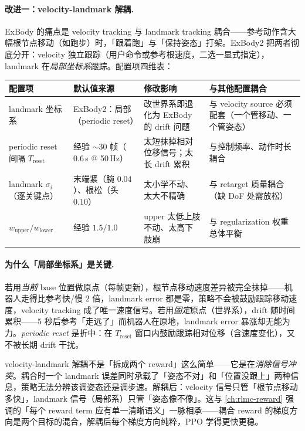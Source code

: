\paragraph{改进一：velocity-landmark 解耦.}
ExBody 的痛点是 velocity tracking 与 landmark tracking 耦合——参考动作含大幅根节点移动（如跑步）时，「跟着跑」与「保持姿态」打架。ExBody2 把两者彻底分开：velocity 独立跟踪（用户命令或参考根速度，二选一显式指定），landmark 在\emph{局部坐标系}跟踪。配置项四维表：

\begin{center}
\small
\begin{tabular}{p{2.6cm}p{2.8cm}p{3.0cm}p{3.0cm}}
\hline
配置项 & 默认值来源 & 修改影响 & 与其他配置耦合 \\
\hline
landmark 坐标系 & ExBody2：局部（periodic reset） & 改世界系即退化为 ExBody 的 drift 问题 & 与 velocity source 必须配套（一个管移动、一个管姿态） \\
periodic reset 间隔 $T_{\mathrm{reset}}$ & 经验 $\sim 30$ 帧（$0.6$\,s @ 50\,Hz） & 太短抹掉相对位移信号；太长 drift 累积 & 与控制频率、动作时长耦合 \\
landmark $\sigma_i$（逐关键点） & 末端紧（腕 $0.04$）、根松（头 $0.10$） & 太小学不动、太大不精确 & 与 retarget 质量耦合（缺 DoF 处需放松） \\
$w_{\mathrm{upper}}/w_{\mathrm{lower}}$ & 经验 $1.5/1.0$ & upper 太低上肢不动、太高下肢崩 & 与 regularization 权重总体平衡 \\
\hline
\end{tabular}
\end{center}


\paragraph{为什么「局部坐标系」是关键.}
若用\emph{当前} base 位置做原点（每帧更新），根节点移动速度差异被完全抹掉——机器人走得比参考快/慢 $2$ 倍，landmark error 都是零，策略不会被鼓励跟踪移动速度，velocity tracking 成了唯一速度信号。若用\emph{固定}原点（世界系），drift 随时间累积——$5$ 秒后参考「走远了」而机器人在原地，landmark error 暴涨却无能为力。\emph{periodic reset} 是折中：在 $T_{\mathrm{reset}}$ 窗口内鼓励跟踪相对位移（含速度变化），又不被长期 drift 干扰。

\begin{insight}\label{ins:rlmc-wbc-decouple}
velocity-landmark 解耦不是「拆成两个 reward」这么简单——它是在\emph{消除信号冲突}。耦合时一个 landmark 误差同时承载了「姿态不对」和「位置没跟上」两种信息，策略无法分辨该调姿态还是调步速。解耦后：velocity 信号只管「根节点移动多快」，landmark 信号（局部系）只管「姿态像不像」。这与 \cref{ch:rlmc-reward} 强调的「每个 reward term 应有单一清晰语义」一脉相承——耦合 reward 的梯度方向是两个目标的混合，解耦后每个梯度方向纯粹，PPO 学得更快更稳。
\end{insight}


